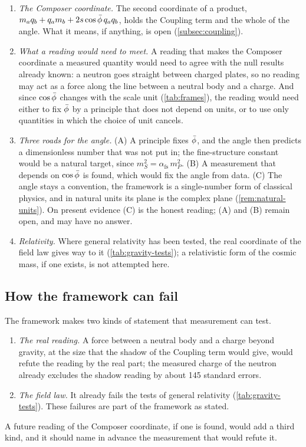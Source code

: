 \begin{enumerate}[label=(\arabic*), leftmargin=2em]
  \item \emph{The Composer coordinate.} The second coordinate of a product, $m_a q_b + q_a m_b + 2s\cos\bar{\phi}\,q_a q_b$, holds the Coupling term and the whole of the angle. What it means, if anything, is open (\cref{subsec:coupling}).
  \item \emph{What a reading would need to meet.} A reading that makes the Composer coordinate a measured quantity would need to agree with the null results already known: a neutron goes straight between charged plates, so no reading may act as a force along the line between a neutral body and a charge. And since $\cos\bar{\phi}$ changes with the scale unit (\cref{tab:frames}), the reading would need either to fix $\bar{\phi}$ by a principle that does not depend on units, or to use only quantities in which the choice of unit cancels.
  \item \emph{Three roads for the angle.} (A) A principle fixes $\bar{\phi}$, and the angle then predicts a dimensionless number that was not put in; the fine-structure constant would be a natural target, since $m_S^2 = \alpha_{\mathrm{fs}}\,m_P^2$. (B) A measurement that depends on $\cos\bar{\phi}$ is found, which would fix the angle from data. (C) The angle stays a convention, the framework is a single-number form of classical physics, and in natural units its plane is the complex plane (\cref{rem:natural-units}). On present evidence (C) is the honest reading; (A) and (B) remain open, and may have no answer.
  \item \emph{Relativity.} Where general relativity has been tested, the real coordinate of the field law gives way to it (\cref{tab:gravity-tests}); a relativistic form of the cosmic mass, if one exists, is not attempted here.
\end{enumerate}

\subsection{How the framework can fail}\label{subsec:fail}

The framework makes two kinds of statement that measurement can test.
\begin{enumerate}[label=(\roman*), leftmargin=2em]
  \item \emph{The real reading.} A force between a neutral body and a charge beyond gravity, at the size that the shadow of the Coupling term would give, would refute the reading by the real part; the measured charge of the neutron already excludes the shadow reading by about 145 standard errors.
  \item \emph{The field law.} It already fails the tests of general relativity (\cref{tab:gravity-tests}). These failures are part of the framework as stated.
\end{enumerate}
A future reading of the Composer coordinate, if one is found, would add a third kind, and it should name in advance the measurement that would refute it.

